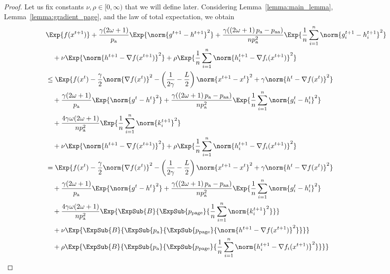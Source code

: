 \documentclass{article}
\newcommand*{\probavailable}{\ensuremath{p_{\textnormal{a}}}}
\newcommand*{\probpairaa}{\ensuremath{p_{\textnormal{aa}}}}
\newcommand*{\probpage}{\ensuremath{p_{\text{page}}}}
\begin{document}
\begin{proof}
  Let us fix constants $\nu, \rho \in [0,\infty)$ that we will define later. Considering Lemma~\ref{lemma:main_lemma}, Lemma~\ref{lemma:gradient_page}, and the law of total expectation, we obtain
    \begin{align*}
      &\Exp{f(x^{t + 1})} + \frac{\gamma (2 \omega + 1)}{\probavailable} \Exp{\norm{g^{t+1} - h^{t+1}}^2} + \frac{\gamma (\left(2 \omega + 1\right)\probavailable - \probpairaa)}{n \probavailable^2} \Exp{\frac{1}{n}\sum_{i=1}^n\norm{g^{t+1}_i - h^{t+1}_i}^2}\\
      &\quad  + \nu \Exp{\norm{h^{t+1} - \nabla f(x^{t+1})}^2} + \rho \Exp{\frac{1}{n}\sum_{i=1}^n\norm{h^{t+1}_i - \nabla f_i(x^{t+1})}^2}\\
      &\leq \Exp{f(x^t) - \frac{\gamma}{2}\norm{\nabla f(x^t)}^2 - \left(\frac{1}{2\gamma} - \frac{L}{2}\right)
      \norm{x^{t+1} - x^t}^2 + \gamma \norm{h^{t} - \nabla f(x^t)}^2}\nonumber\\
      &\quad + \frac{\gamma (2 \omega + 1)}{\probavailable}\Exp{\norm{g^{t} - h^t}^2}+ \frac{\gamma (\left(2 \omega + 1\right)\probavailable - \probpairaa)}{n \probavailable^2}\Exp{\frac{1}{n} \sum_{i=1}^n\norm{g^t_i - h^{t}_i}^2} \\
      &\quad + \frac{4 \gamma \omega (2 \omega + 1)}{n \probavailable^2} \Exp{\frac{1}{n} \sum_{i=1}^n\norm{k^{t+1}_i}^2} \\
      &\quad  + \nu \Exp{\norm{h^{t+1} - \nabla f(x^{t+1})}^2} + \rho \Exp{\frac{1}{n}\sum_{i=1}^n\norm{h^{t+1}_i - \nabla f_i(x^{t+1})}^2}\\
      &= \Exp{f(x^t) - \frac{\gamma}{2}\norm{\nabla f(x^t)}^2 - \left(\frac{1}{2\gamma} - \frac{L}{2}\right)
      \norm{x^{t+1} - x^t}^2 + \gamma \norm{h^{t} - \nabla f(x^t)}^2}\nonumber\\
      &\quad + \frac{\gamma (2 \omega + 1)}{\probavailable}\Exp{\norm{g^{t} - h^t}^2}+ \frac{\gamma (\left(2 \omega + 1\right)\probavailable - \probpairaa)}{n \probavailable^2}\Exp{\frac{1}{n} \sum_{i=1}^n\norm{g^t_i - h^{t}_i}^2} \\
      &\quad + \frac{4 \gamma \omega (2 \omega + 1)}{n \probavailable^2} \Exp{\ExpSub{B}{\ExpSub{\probpage}{\frac{1}{n} \sum_{i=1}^n\norm{k^{t+1}_i}^2}}} \\
      &\quad  + \nu \Exp{\ExpSub{B}{\ExpSub{\probavailable}{\ExpSub{\probpage}{\norm{h^{t+1} - \nabla f(x^{t+1})}^2}}}} \\
      &\quad + \rho \Exp{\ExpSub{B}{\ExpSub{\probavailable}{\ExpSub{\probpage}{\frac{1}{n}\sum_{i=1}^n\norm{h^{t+1}_i - \nabla f_i(x^{t+1})}^2}}}}\\

\end{align*}
\end{proof}
\end{document}
